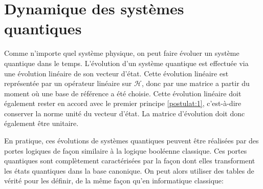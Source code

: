 \chapter{Dynamique des systèmes quantiques}
\label{appendix:dynamic}

Comme n'importe quel système physique, on peut faire évoluer un système quantique dans le temps. L'évolution d'un système quantique est effectuée via une évolution linéaire de son vecteur d'état. Cette évolution linéaire est représentée par un opérateur linéaire sur $\mathcal{H}$, donc par une matrice a partir du moment où une base de référence a été choisie. Cette évolution linéaire doit également rester en accord avec le premier principe \ref{postulat:1}, c'est-à-dire conserver la norme unité du vecteur d'état. La matrice d'évolution doit donc également être unitaire.





\medbreak

En pratique, ces évolutions de systèmes quantiques peuvent être réalisées par des portes logiques de façon similaire à la logique booléenne classique. Ces portes quantiques sont complètement caractérisées par la façon dont elles transforment les états quantiques dans la base canonique. On peut alors utiliser des tables de vérité pour les définir, de la même façon qu'en informatique classique:

